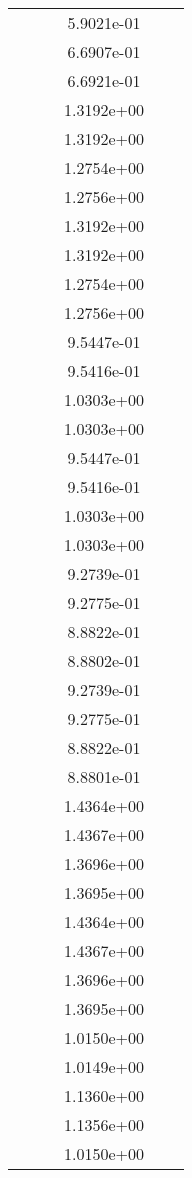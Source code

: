 \begin{xltabular}{\textwidth}{r|rS[table-format=1.3e+2]S[table-format=1.4e+2]S[table-format=1.4e+2]S[table-format=-1.5]}
&  &  & 5.9021e-01 & & \\
&  &  & 6.6907e-01 & & \\
&  &  & 6.6921e-01 & & \\
&  &  & 1.3192e+00 & & \\
&  &  & 1.3192e+00 & & \\
&  &  & 1.2754e+00 & & \\
&  &  & 1.2756e+00 & & \\
&  &  & 1.3192e+00 & & \\
&  &  & 1.3192e+00 & & \\
&  &  & 1.2754e+00 & & \\
&  &  & 1.2756e+00 & & \\
&  &  & 9.5447e-01 & & \\
&  &  & 9.5416e-01 & & \\
&  &  & 1.0303e+00 & & \\
&  &  & 1.0303e+00 & & \\
&  &  & 9.5447e-01 & & \\
&  &  & 9.5416e-01 & & \\
&  &  & 1.0303e+00 & & \\
&  &  & 1.0303e+00 & & \\
&  &  & 9.2739e-01 & & \\
&  &  & 9.2775e-01 & & \\
&  &  & 8.8822e-01 & & \\
&  &  & 8.8802e-01 & & \\
&  &  & 9.2739e-01 & & \\
&  &  & 9.2775e-01 & & \\
&  &  & 8.8822e-01 & & \\
&  &  & 8.8801e-01 & & \\
&  &  & 1.4364e+00 & & \\
&  &  & 1.4367e+00 & & \\
&  &  & 1.3696e+00 & & \\
&  &  & 1.3695e+00 & & \\
&  &  & 1.4364e+00 & & \\
&  &  & 1.4367e+00 & & \\
&  &  & 1.3696e+00 & & \\
&  &  & 1.3695e+00 & & \\
&  &  & 1.0150e+00 & & \\
&  &  & 1.0149e+00 & & \\
&  &  & 1.1360e+00 & & \\
&  &  & 1.1356e+00 & & \\
&  &  & 1.0150e+00 & & \\

\end{xltabular}
